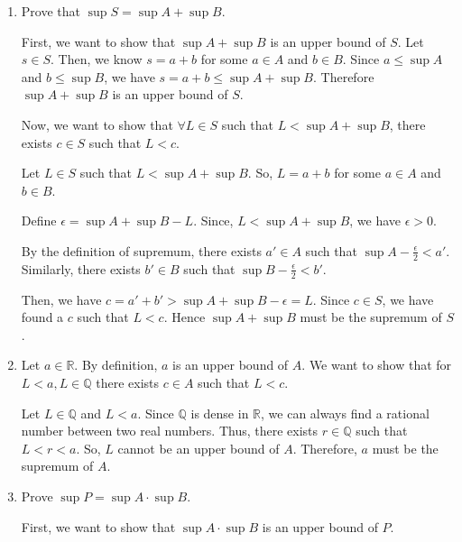 \documentclass[12pt]{article}
\begin{document}

\begin{enumerate}[start=1,label={\bfseries Problem \arabic*:},leftmargin=1in] %
    \item Prove that $\sup S = \sup A + \sup B$. 
    
    First, we want to show that $\sup A + \sup B$ is an upper bound of $S$. 
    Let $s \in S$. Then, we know $s = a+b$ for some $a \in A$ and $b \in B$.
    Since $a \leq \sup A$ and $b \leq \sup B$, we have $s = a+b \leq \sup A + \sup B$.
    Therefore $\sup A + \sup B$ is an upper bound of $S$.

    Now, we want to show that $\forall  L \in S$ such that $L < \sup A + \sup B$, there exists $c \in S$ such that $L < c$.
    
    Let $L \in S$ such that $L < \sup A + \sup B$. 
    So, $L = a + b$ for some $a \in A$ and $b \in B$. 

    Define $\epsilon = \sup  A + \sup B - L$. Since, $L < \sup A + \sup B$, we have $\epsilon > 0$.

    By the definition of supremum, there exists $a' \in A$ such that $\sup A - \frac{\epsilon}{2} < a'$.
    Similarly, there exists $b' \in B$ such that $\sup B - \frac{\epsilon}{2} < b'$.

    Then, we have  $c = a' + b' > \sup A + \sup B - \epsilon = L$. Since $c \in S$, we have found a $c$ such that $L < c$. Hence $\sup A + \sup B$ must be the supremum of $S$. 

    \item Let $a \in \mathbb{R}$. By definition, $a$ is an upper bound of $A$. 
    We want to show that for $L < a, L \in \mathbb{Q}$ there exists $c \in A$ such that $L < c$.

    Let $L \in \mathbb{Q}$ and $L < a$. Since $\mathbb{Q}$ is dense in $\mathbb{R}$, we can always find a rational number between two real numbers. Thus, there exists $r \in \mathbb{Q}$ such that $L < r < a$.
    So, $L$ cannot be an upper bound of $A$. Therefore, $a$ must be the supremum of $A$.

    \item Prove $\sup P = \sup A \cdot \sup B$. 
    
    First, we want to show that $\sup A \cdot \sup B$ is an upper bound of $P$.


\end{enumerate}
\end{document}
